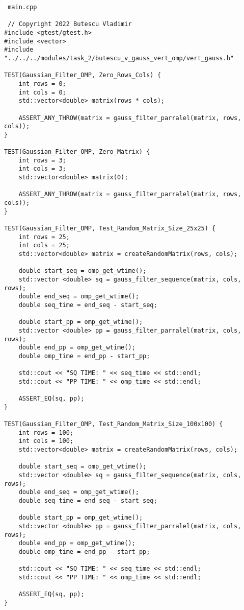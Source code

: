 \documentclass{report}
\begin{document}
\begin{lstlisting}
 main.cpp
 
 // Copyright 2022 Butescu Vladimir
#include <gtest/gtest.h>
#include <vector>
#include "../../../modules/task_2/butescu_v_gauss_vert_omp/vert_gauss.h"

TEST(Gaussian_Filter_OMP, Zero_Rows_Cols) {
    int rows = 0;
    int cols = 0;
    std::vector<double> matrix(rows * cols);

    ASSERT_ANY_THROW(matrix = gauss_filter_parralel(matrix, rows, cols));
}

TEST(Gaussian_Filter_OMP, Zero_Matrix) {
    int rows = 3;
    int cols = 3;
    std::vector<double> matrix(0);

    ASSERT_ANY_THROW(matrix = gauss_filter_parralel(matrix, rows, cols));
}

TEST(Gaussian_Filter_OMP, Test_Random_Matrix_Size_25x25) {
    int rows = 25;
    int cols = 25;
    std::vector<double> matrix = createRandomMatrix(rows, cols);

    double start_seq = omp_get_wtime();
    std::vector <double> sq = gauss_filter_sequence(matrix, cols, rows);
    double end_seq = omp_get_wtime();
    double seq_time = end_seq - start_seq;

    double start_pp = omp_get_wtime();
    std::vector <double> pp = gauss_filter_parralel(matrix, cols, rows);
    double end_pp = omp_get_wtime();
    double omp_time = end_pp - start_pp;

    std::cout << "SQ TIME: " << seq_time << std::endl;
    std::cout << "PP TIME: " << omp_time << std::endl;

    ASSERT_EQ(sq, pp);
}

TEST(Gaussian_Filter_OMP, Test_Random_Matrix_Size_100x100) {
    int rows = 100;
    int cols = 100;
    std::vector<double> matrix = createRandomMatrix(rows, cols);

    double start_seq = omp_get_wtime();
    std::vector <double> sq = gauss_filter_sequence(matrix, cols, rows);
    double end_seq = omp_get_wtime();
    double seq_time = end_seq - start_seq;

    double start_pp = omp_get_wtime();
    std::vector <double> pp = gauss_filter_parralel(matrix, cols, rows);
    double end_pp = omp_get_wtime();
    double omp_time = end_pp - start_pp;

    std::cout << "SQ TIME: " << seq_time << std::endl;
    std::cout << "PP TIME: " << omp_time << std::endl;

    ASSERT_EQ(sq, pp);
}


\end{lstlisting}
\end{document}
